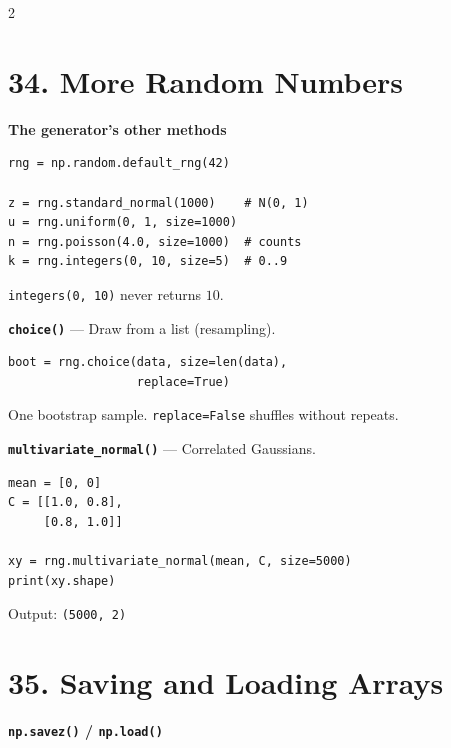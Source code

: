 \documentclass[10pt,a4paper]{article}
\begin{document}
\begin{multicols}{2}
\section*{34. More Random Numbers}

\begin{card}
\textbf{The generator's other methods}

\begin{lstlisting}[style=pythonstyle]
rng = np.random.default_rng(42)

z = rng.standard_normal(1000)    # N(0, 1)
u = rng.uniform(0, 1, size=1000)
n = rng.poisson(4.0, size=1000)  # counts
k = rng.integers(0, 10, size=5)  # 0..9
\end{lstlisting}

\texttt{integers(0, 10)} never returns $10$.
\end{card}

\begin{card}
\textbf{\texttt{choice()}} --- Draw from a list (resampling).

\begin{lstlisting}[style=pythonstyle]
boot = rng.choice(data, size=len(data),
                  replace=True)
\end{lstlisting}

One bootstrap sample. \texttt{replace=False} shuffles without repeats.
\end{card}

\begin{card}
\textbf{\texttt{multivariate\_normal()}} --- Correlated Gaussians.

\begin{lstlisting}[style=pythonstyle]
mean = [0, 0]
C = [[1.0, 0.8],
     [0.8, 1.0]]

xy = rng.multivariate_normal(mean, C, size=5000)
print(xy.shape)
\end{lstlisting}

Output:
\texttt{(5000, 2)}
\end{card}

\section*{35. Saving and Loading Arrays}

\begin{card}
\textbf{\texttt{np.savez()} / \texttt{np.load()}}


\end{card}
\end{multicols}
\end{document}
